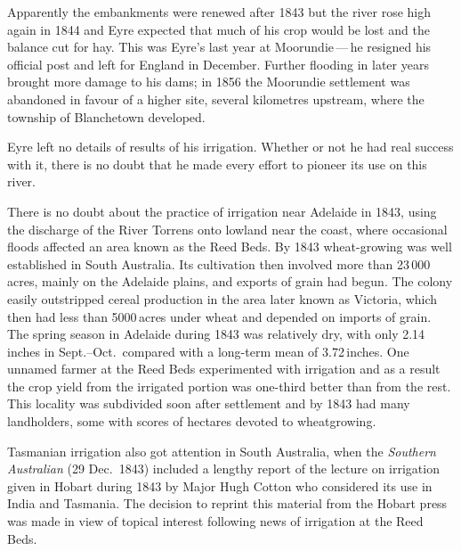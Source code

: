 Apparently the embankments were renewed after 1843 but the river rose
high again in 1844 and Eyre expected that much of his crop would be
lost and the balance cut for hay.  This was Eyre's last
year at Moor\-undie\,---\,he resigned his official post and left for
England in December.  Further flooding in later years brought more
damage to his dams; in 1856 the Moorundie
settlement was abandoned in favour of a higher site, several
kilometres upstream, where the township of Blanchetown
 developed.

Eyre left no details of results of his irrigation.  Whether or not he
had real success with it, there is no doubt that he made every effort
to pioneer its use on this river.

There is no doubt about the practice of irrigation near Adelaide in
1843, using the discharge of the River Torrens 
onto lowland near the coast, where occasional floods affected an area
known as the Reed Beds.  By 1843 wheat-growing
 was well established in South Australia.  Its
cultivation then involved more than 23\,000\,acres, mainly on the
Adelaide  plains, and exports of grain had begun.
The colony easily outstripped cereal production in the
area later known as Victoria, which then had less than 5000\,acres
under wheat and depended on imports of grain.  The spring
season in Adelaide during 1843 was relatively dry, with only
2.14\,inches in Sept.--Oct.\ compared with a long-term mean of
3.72\,inches.  One unnamed farmer at the Reed Beds experimented with
irrigation and as a result the crop yield from the irrigated portion
was one-third better than from the rest.  This locality was subdivided
soon after settlement and by 1843 had many landholders, some with
scores of hectares devoted to
wheatgrowing.

Tasmanian irrigation also got attention in South Australia, when the
\textit{Southern Australian} (29 Dec.\ 1843) included a lengthy report of
the lecture on irrigation given in Hobart during 1843 by Major Hugh
Cotton  who considered its use in India and
Tasmania.  The decision to reprint this material from the Hobart press
was made in view of topical interest following news of irrigation at
the Reed Beds.

